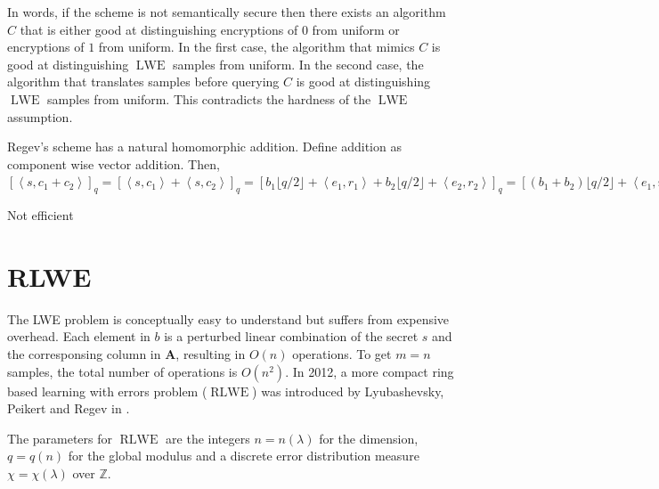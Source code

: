 In words, if the scheme is not semantically secure then there exists an algorithm $C$ that is either good at distinguishing encryptions of $0$ from uniform or encryptions of $1$ from uniform. In the first case, the algorithm that mimics $C$ is good at distinguishing $\operatorname{LWE}$ samples from uniform. In the second case, the algorithm that translates samples before querying $C$ is good at distinguishing $\operatorname{LWE}$ samples from uniform. This contradicts the hardness of the $\operatorname{LWE}$ assumption.

Regev's scheme has a natural homomorphic addition. Define addition as component wise vector addition. Then, $[\left \langle s, c_1 + c_2 \right \rangle]_q = [\left \langle s, c_1 \right \rangle + \left \langle s, c_2 \right \rangle]_q = [b_1 \lfloor q/2 \rfloor + \left \langle e_1, r_1 \right \rangle + b_2 \lfloor q/2 \rfloor + \left \langle e_2, r_2 \right \rangle]_q = [(b_1+b_2) \lfloor q/2 \rfloor + \left \langle e_1, r_1 \right \rangle + \left \langle e_2, r_2 \right \rangle]_q$

Not efficient

\section{RLWE}
The LWE problem is conceptually easy to understand but suffers from expensive overhead. Each element in $b$ is a perturbed linear combination of the secret $s$ and the corresponsing column in $\textbf{A}$, resulting in $O(n)$ operations. To get $m = n$ samples, the total number of operations is $O(n^2)$. In 2012, a more compact ring based learning with errors problem ($\operatorname{RLWE}$) was introduced by Lyubashevsky, Peikert and Regev in \cite{RLWE}.

The parameters for $\operatorname{RLWE}$ are the integers $n = n(\lambda)$ for the dimension, $q = q(n)$ for the global modulus and a discrete error distribution measure $\chi = \chi(\lambda)$ over $\mathbb{Z}$.

